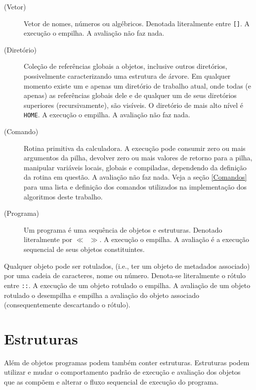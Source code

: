 \documentclass[12pt,a4paper]{report}
\newcommand{\kwd}[1]{\texttt{\textcolor{keyword}{#1}}}
\newcommand{\HOME}{\kwd{HOME}}   %
\newcommand{\OP}{\kwd{$\ll$}}   %
\newcommand{\CP}{\kwd{$\gg$}}   %
\numberwithin{theorem}{chapter}
\begin{document}
\begin{description}
\item[(Vetor)] Vetor de nomes, números ou algébricos.  Denotada
  literalmente entre \texttt{[]}.  A execução o empilha.  A avaliação
  não faz nada.

\item[(Diretório)] Coleção de referências globais a objetos, inclusive
  outros diretórios, possivelmente caracterizando uma estrutura de
  árvore.  Em qualquer momento existe um e apenas um diretório de
  trabalho atual, onde todas (e apenas) as referências globais dele e
  de qualquer um de seus diretórios superiores (recursivamente), são
  visíveis.  O diretório de mais alto nível é \texttt{\HOME}.  A
  execução o empilha.  A avaliação não faz nada.

\item[(Comando)] Rotina primitiva da calculadora.  A execução pode
  consumir zero ou mais argumentos da pilha, devolver zero ou mais
  valores de retorno para a pilha, manipular variáveis locais, globais
  e compiladas, dependendo da definição da rotina em questão.  A
  avaliação não faz nada.  Veja a seção \ref{Comandos} para uma lista
  e definição dos comandos utilizados na implementação dos algoritmos
  deste trabalho.

\item[(Programa)] Um programa é uma sequência de objetos e estruturas.
  Denotado literalmente por \texttt{\OP\ \CP}.  A execução o empilha.
  A avaliação é a execução sequencial de seus objetos constituintes.
\end{description}

Qualquer objeto pode ser rotulados, (i.e., ter um objeto de metadados
associado) por uma cadeia de caracteres, nome ou número.  Denota-se
literalmente o rótulo entre \texttt{::}.  A execução de um objeto
rotulado o empilha.  A avaliação de um objeto rotulado o desempilha e
empilha a avaliação do objeto associado (consequentemente descartando
o rótulo).



\section{Estruturas}

Além de objetos programas podem também conter estruturas.  Estruturas
podem utilizar e mudar o comportamento padrão de execução e avaliação
dos objetos que as compõem e alterar o fluxo sequencial de execução do
programa.

\vspace{1em}
\end{document}
